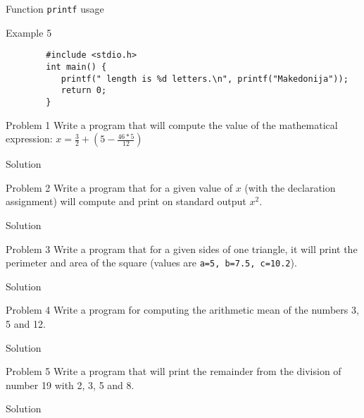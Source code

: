 \begin{frame}[fragile]{Function \texttt{printf} usage}
    \begin{exampleblock}{Example 5}
        \begin{lstlisting}
        #include <stdio.h>
        int main() {
           printf(" length is %d letters.\n", printf("Makedonija"));
           return 0;
        }
        \end{lstlisting}
    \end{exampleblock}
\end{frame}

\begin{frame}[fragile]{Problem 1}
    Write a program that will compute the value of the mathematical expression:
    $ x = \frac{3}{2} + (5 - \frac{46 * 5}{12})$
    \begin{exampleblock}{Solution}
    
    \end{exampleblock}
\end{frame}

\begin{frame}[fragile]{Problem 2}
Write a program that for a given value of $ x $ (with the declaration
assignment) will compute and print on standard output $ x^2 $.
    \begin{exampleblock}{Solution}
    
    \end{exampleblock}
\end{frame}

\begin{frame}[fragile]{Problem 3}
Write a program that for a given sides of one triangle, it will print the
perimeter and area of the square (values are \texttt{a=5, b=7.5,
c=10.2}).
    \begin{exampleblock}{Solution}
            
    \end{exampleblock}
\end{frame}

\begin{frame}[fragile]{Problem 4}
Write a program for computing the arithmetic mean of the numbers 3, 5 and 12.
    \begin{exampleblock}{Solution}
    
    \end{exampleblock}
\end{frame}

\begin{frame}[fragile]{Problem 5}
Write a program that will print the remainder from the division of number 19
with 2, 3, 5 and 8.
    \begin{exampleblock}{Solution}
            
    \end{exampleblock}
\end{frame}

